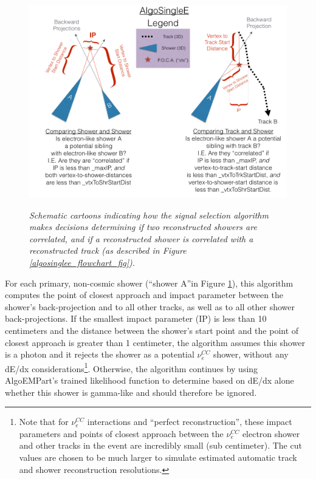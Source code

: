 \begin{figure}[ht!]
\centering
\includegraphics[width=150mm]{Figures/algosinglee_cartoon.png}\\
\caption{\textit{Schematic cartoons indicating how the signal selection algorithm makes decisions determining if two reconstructed showers are correlated, and if a reconstructed shower is correlated with a reconstructed track (as described in Figure \ref{algosinglee_flowchart_fig}).}}
\label{algosinglee_cartoon_fig}
\end{figure}

For each primary, non-cosmic shower (``shower A''in Figure \ref{algosinglee_cartoon_fig}), this algorithm computes the point of closest approach and impact parameter between the shower's back-projection and to all other tracks, as well as to all other shower back-projections. If the smallest impact parameter (IP) is less than 10 centimeters and the distance between the shower's start point and the point of closest approach is greater than 1 centimeter, the algorithm assumes this shower is a photon and it rejects the shower as a potential $\nu_e^{CC}$ shower, without any dE/dx considerations\footnote{Note that for $\nu_e^{CC}$ interactions and ``perfect reconstruction'', these impact parameters and points of closest approach between the $\nu_e^{CC}$ electron shower and other tracks in the event are incredibly small (sub centimeter). The cut values are chosen to be much larger to simulate estimated automatic track and shower reconstruction resolutions.}. Otherwise, the algorithm continues by using AlgoEMPart's trained likelihood function to determine based on dE/dx alone whether this shower is gamma-like and should therefore be ignored.\\


